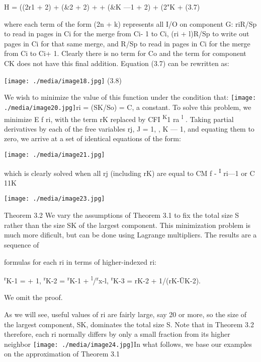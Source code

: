\documentclass[a4paper,11pt,notitlepage,twoside,openright]{article}
\begin{document}
H = ((2r1 + 2) + (\&2 + 2) + + (\&K ---1 + 2) + (2"K + (3.7)


where each term of the form (2n + k) represents all I/O on component G:
riR/Sp to read in pages in Ci for the merge from Ci- 1 to Ci, (ri +
l)R/Sp to write out pages in Ci for that same merge, and R/Sp to read in
pages in Ci for the merge from Ci to Ci+ 1. Clearly there is no term for
Co and the term for component CK does not have this final addition.
Equation (3.7) can be rewritten as:


\texttt{[image: ./media/image18.jpg]}
(3.8)


We wish to minimize the value of this function under the condition that:
\texttt{[image: ./media/image20.jpg]}ri
= (SK/So) = C, a constant. To solve this problem, we minimize E f ri,
with the term rK replaced by CFI \textsuperscript{K}1 ra
\textsuperscript{l} . Taking partial derivatives by each of the free
variables rj, J = 1, , K --- 1, and equating them to zero, we arrive at
a set of identical equations of the form:

\texttt{[image: ./media/image21.jpg]}

which is clearly solved when all rj (including rK) are equal to CM f -
\textsuperscript{I} ri---1 or C 11K

\texttt{[image: ./media/image23.jpg]}

Theorem 3.2 We vary the assumptions of Theorem 3.1 to fix the total size
S rather than the size SK of the largest component. This minimization
problem is much more dificult, but can be done using Lagrange
multipliers. The results are a sequence of

formulas for each ri in terms of higher-indexed ri:

\textsuperscript{r}K-1 = + 1, \textsuperscript{r}K-2 =
\textsuperscript{r}K-1 + \textsuperscript{l}/\textsuperscript{r}x-l,
\textsuperscript{r}K-3 = rK-2 + 1/(rK-ÜK-2).

We omit the proof.

As we will see, useful values of ri are fairly large, say 20 or more, so
the size of the largest component, SK, dominates the total size S. Note
that in Theorem 3.2 therefore, each ri normally differs by only a small
fraction from its higher neighbor
\texttt{[image: ./media/image24.jpg]}In
what follows, we base our examples on the approximation of Theorem 3.1
\end{document}
